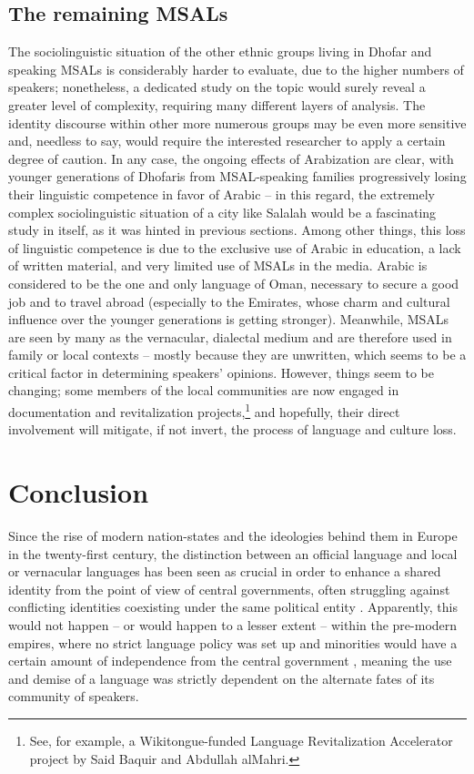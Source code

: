 \documentclass[output=paper]{langscibook}
\begin{document}
\subsection{The remaining MSALs}
The sociolinguistic situation of the other ethnic groups living in Dhofar and speaking MSALs is considerably harder to evaluate, due to the higher numbers of speakers; nonetheless, a dedicated study on the topic would surely reveal a greater level of complexity, requiring many different layers of analysis. The identity discourse within other more numerous groups may be even more sensitive and, needless to say, would require the interested researcher to apply a certain degree of caution. In any case, the ongoing effects of Arabization are clear, with younger generations of Dhofaris from MSAL-speaking families progressively losing their linguistic competence in favor of Arabic \citep{morris_thoughts_2017} – in this regard, the extremely complex sociolinguistic situation of a city like Salalah would be a fascinating study in itself, as it was hinted in previous sections. Among other things, this loss of linguistic competence is due to the exclusive use of Arabic in education, a lack of written material, and very limited use of MSALs in the media. Arabic is considered to be the one and only language of Oman, necessary to secure a good job and to travel abroad (especially to the Emirates, whose charm and cultural influence over the younger generations is getting stronger). Meanwhile, MSALs are seen by many as the vernacular, dialectal medium and are therefore used in family or local contexts – mostly because they are unwritten, which seems to be a critical factor in determining speakers’ opinions. However, things seem to be changing; some members of the local communities are now engaged in documentation and revitalization projects,\footnote{See, for example, a Wikitongue-funded Language Revitalization Accelerator project by Said Baquir and Abdullah alMahri.}  and hopefully, their direct involvement will mitigate, if not invert, the process of language and culture loss. 


\section{Conclusion}
Since the rise of modern nation-states and the ideologies behind them in Europe in the twenty-first century, the distinction between an official language and local or vernacular languages has been seen as crucial in order to enhance a shared identity from the point of view of central governments, often struggling against conflicting identities coexisting under the same political entity \citep{bonfiglio_deconstructing_2010}. Apparently, this would not happen – or would happen to a lesser extent – within the pre-modern empires, where no strict language policy was set up and minorities would have a certain amount of independence from the central government \citep{stolz_arabic_2015}, meaning the use and demise of a language was strictly dependent on the alternate fates of its community of speakers.
\end{document}
